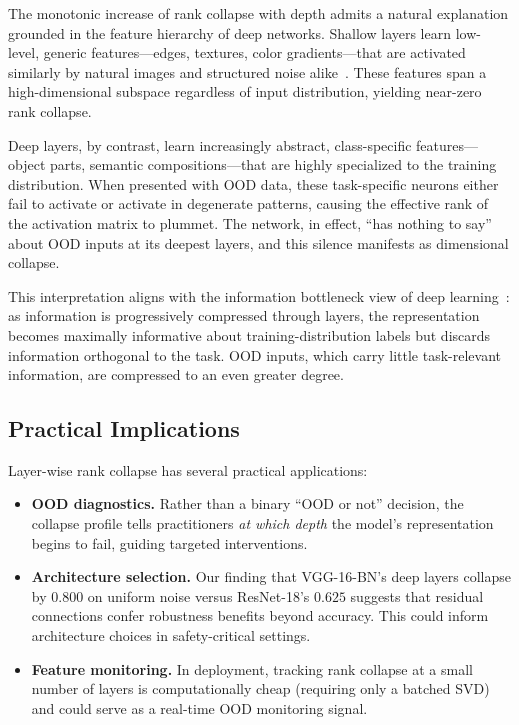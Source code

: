 \documentclass{article}
\begin{document}
The monotonic increase of rank collapse with depth admits a natural explanation grounded in the feature hierarchy of deep networks. Shallow layers learn low-level, generic features---edges, textures, color gradients---that are activated similarly by natural images and structured noise alike~\citep{yosinski2014transferable}. These features span a high-dimensional subspace regardless of input distribution, yielding near-zero rank collapse.

Deep layers, by contrast, learn increasingly abstract, class-specific features---object parts, semantic compositions---that are highly specialized to the training distribution. When presented with OOD data, these task-specific neurons either fail to activate or activate in degenerate patterns, causing the effective rank of the activation matrix to plummet. The network, in effect, ``has nothing to say'' about OOD inputs at its deepest layers, and this silence manifests as dimensional collapse.

This interpretation aligns with the information bottleneck view of deep learning~\citep{shwartz2017opening}: as information is progressively compressed through layers, the representation becomes maximally informative about training-distribution labels but discards information orthogonal to the task. OOD inputs, which carry little task-relevant information, are compressed to an even greater degree.

\subsection{Practical Implications}

Layer-wise rank collapse has several practical applications:

\begin{itemize}
    \item \textbf{OOD diagnostics.} Rather than a binary ``OOD or not'' decision, the collapse profile tells practitioners \emph{at which depth} the model's representation begins to fail, guiding targeted interventions.
    \item \textbf{Architecture selection.} Our finding that VGG-16-BN's deep layers collapse by $0.800$ on uniform noise versus ResNet-18's $0.625$ suggests that residual connections confer robustness benefits beyond accuracy. This could inform architecture choices in safety-critical settings.
    \item \textbf{Feature monitoring.} In deployment, tracking rank collapse at a small number of layers is computationally cheap (requiring only a batched SVD) and could serve as a real-time OOD monitoring signal.
\end{itemize}
\end{document}
